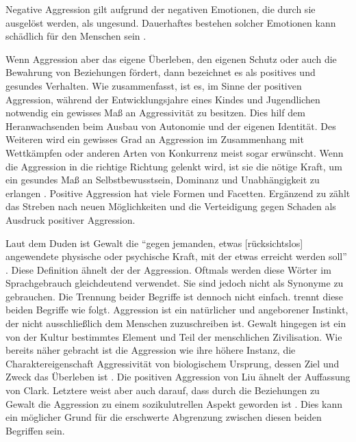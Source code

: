 Negative Aggression gilt 
aufgrund der negativen Emotionen, die durch sie ausgelöst werden, als ungesund. Dauerhaftes 
bestehen solcher Emotionen kann  schädlich für den Menschen sein \parencite{Aggression}.

Wenn Aggression aber das eigene Überleben, den eigenen Schutz oder auch die Bewahrung 
von Beziehungen fördert, dann bezeichnet \textcite{positive_aggression} 
es als positives und gesundes Verhalten. Wie \textcite{Aggression} 
zusammenfasst, ist es, im Sinne der positiven Aggression, während der Entwicklungsjahre eines 
Kindes und Jugendlichen notwendig ein gewisses Maß an Aggressivität zu besitzen. Dies hilf dem 
Heranwachsenden beim Ausbau von Autonomie und der eigenen Identität. Des Weiteren wird ein 
gewisses Grad an Aggression im Zusammenhang mit Wettkämpfen oder anderen Arten von Konkurrenz 
meist sogar erwünscht. Wenn die Aggression in die richtige Richtung gelenkt wird, ist sie die 
nötige Kraft, um ein gesundes Maß an Selbstbewusstsein, Dominanz und Unabhängigkeit zu erlangen \parencite{Aggression}.
Positive Aggression hat viele Formen und Facetten. Ergänzend zu \textcite{positive_aggression}
zählt \textcite{jack1999behind}
das Streben nach neuen Möglichkeiten und die Verteidigung gegen Schaden als Ausdruck positiver 
Aggression.

Laut dem Duden ist Gewalt die \enquote{gegen jemanden, etwas [rücksichtslos] angewendete
physische oder psychische Kraft, mit der etwas erreicht werden soll} \parencite{Gewalt_Duden}.
Diese Definition ähnelt der der Aggression. Oftmals werden diese Wörter im Sprachgebrauch
gleichdeutend verwendet. Sie sind jedoch nicht als Synonyme zu gebrauchen. Die Trennung beider
Begriffe ist dennoch nicht einfach. \textcite{Def_Aggressivität_vs_violence}
trennt diese beiden Begriffe wie folgt. Aggression ist ein natürlicher und angeborener Instinkt, 
der nicht ausschließlich dem Menschen zuzuschreiben ist. Gewalt hingegen ist ein von der Kultur
bestimmtes Element und Teil der menschlichen Zivilisation. Wie bereits näher gebracht ist die 
Aggression wie ihre höhere Instanz, die Charaktereigenschaft Aggressivität von biologischem 
Ursprung, dessen Ziel und Zweck das Überleben ist \parencite{Def_Aggressivität_vs_violence, Aggression}.
Die positiven Aggression von Liu ähnelt der Auffassung von Clark. Letztere weist aber auch
darauf, dass durch die Beziehungen zu Gewalt die Aggression zu einem sozikulutrellen Aspekt
geworden ist \parencite{Def_Aggressivität_vs_violence}.
Dies kann ein möglicher Grund für die erschwerte Abgrenzung zwischen diesen beiden
Begriffen sein. 

